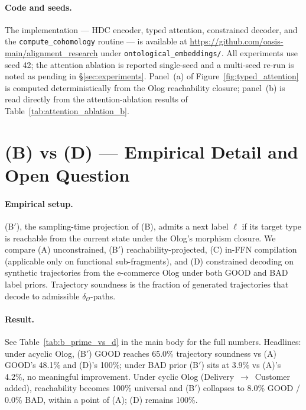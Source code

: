 \paragraph{Code and seeds.} The implementation --- HDC encoder, typed
attention, constrained decoder, and the \texttt{compute\_cohomology}
routine --- is available at
\url{https://github.com/oasis-main/alignment_research} under
\texttt{ontological\_embeddings/}. All experiments use seed 42; the
attention ablation is reported single-seed and a multi-seed re-run is
noted as pending in \S\ref{sec:experiments}. Panel~(a) of
Figure~\ref{fig:typed_attention} is computed deterministically from the
Olog reachability closure; panel~(b) is read directly from the
attention-ablation results of Table~\ref{tab:attention_ablation_b}.

\section{(B) vs (D) --- Empirical Detail and Open Question}
\label{app:b_vs_d}

\paragraph{Empirical setup.} (B$'$), the sampling-time projection of (B),
admits a next label $\ell$ if its target type is reachable from the
current state under the Olog's morphism closure. We compare (A)
unconstrained, (B$'$) reachability-projected, (C) in-FFN compilation
(applicable only on functional sub-fragments), and (D) constrained
decoding on synthetic trajectories from the e-commerce Olog under both
GOOD and BAD label priors. Trajectory soundness is the fraction of
generated trajectories that decode to admissible $\delta_\mathcal{O}$-paths.

\paragraph{Result.} See Table~\ref{tab:b_prime_vs_d} in the main body
for the full numbers. Headlines: under acyclic Olog, (B$'$) GOOD reaches
65.0\% trajectory soundness vs (A) GOOD's 48.1\% and (D)'s 100\%;
under BAD prior (B$'$) sits at 3.9\% vs (A)'s 4.2\%, no meaningful
improvement. Under cyclic Olog (Delivery~$\to$~Customer added),
reachability becomes 100\% universal and (B$'$) collapses to 8.0\% GOOD
/ 0.0\% BAD, within a point of (A); (D) remains 100\%.

